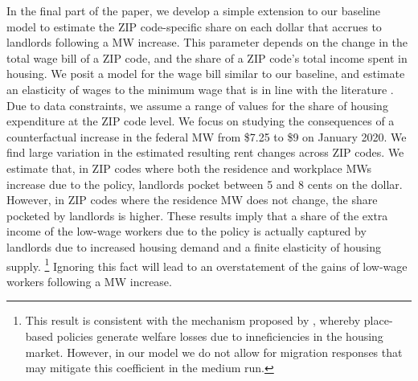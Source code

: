 In the final part of the paper, we develop a simple extension to our baseline 
model to estimate the ZIP code-specific share on each dollar that accrues to 
landlords following a MW increase.
This parameter depends on the change in the total wage bill of a ZIP code, and 
the share of a ZIP code's total income spent in housing.
We posit a model for the wage bill similar to our baseline, and estimate an 
elasticity of wages to the minimum wage that is in line with the literature
\parencite[e.g.,][]{CegnizEtAl2019}.
Due to data constraints, we assume a range of values for the share of housing
expenditure at the ZIP code level.
We focus on studying the consequences of a counterfactual increase in the federal 
MW from \$7.25 to \$9 on January 2020.
We find large variation in the estimated resulting rent changes across ZIP codes.
We estimate that, in ZIP codes where both the residence and workplace MWs increase
due to the policy, landlords pocket between 5 and 8 cents on the dollar.
However, in ZIP codes where the residence MW does not change, the share pocketed
by landlords is higher. 
These results imply that a share of the extra income of the low-wage workers
due to the policy is actually captured by landlords due to increased housing 
demand and a finite elasticity of housing supply.%
\footnote{This result is consistent with the mechanism proposed by 
\textcite{KlineMoretti2014}, whereby place-based policies generate welfare 
losses due to inneficiencies in the housing market.
However, in our model we do not allow for migration responses that may mitigate 
this coefficient in the medium run.}
Ignoring this fact will lead to an overstatement of the gains of low-wage 
workers following a MW increase.



